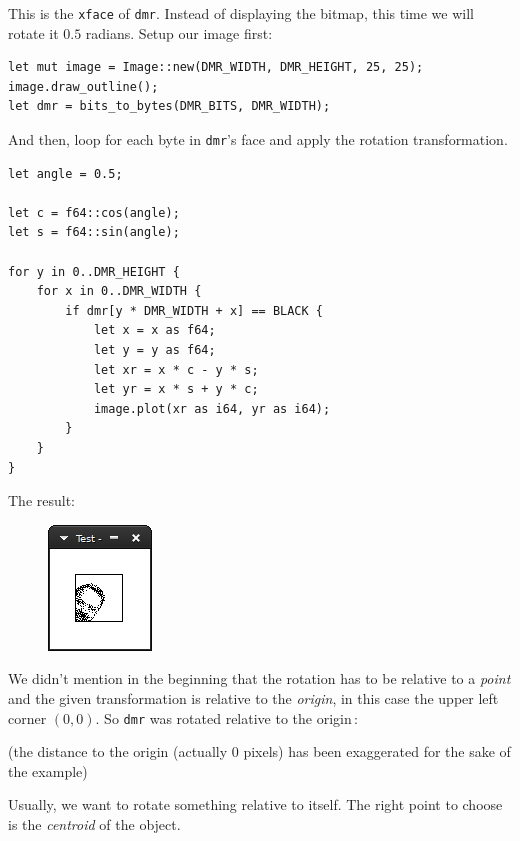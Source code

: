 \documentclass[12pt,openany,a4,usenames,dvipsnames]{book}
\newcommand\bitmap{{\pixelfont{}bitmap}}
\newcommand\pixels{{\pixelfont{}pixels}}
\begin{document}
This is the \texttt{xface} of \texttt{dmr}. Instead of displaying the \bitmap{}, this time we will rotate it $0.5$ radians. Setup our image first:


\begin{verbatim}
let mut image = Image::new(DMR_WIDTH, DMR_HEIGHT, 25, 25);
image.draw_outline();
let dmr = bits_to_bytes(DMR_BITS, DMR_WIDTH);
\end{verbatim}

And then, loop for each byte in \texttt{dmr}'s face and apply the rotation transformation.

\begin{verbatim}
let angle = 0.5;

let c = f64::cos(angle);
let s = f64::sin(angle);

for y in 0..DMR_HEIGHT {
    for x in 0..DMR_WIDTH {
        if dmr[y * DMR_WIDTH + x] == BLACK {
            let x = x as f64;
            let y = y as f64;
            let xr = x * c - y * s;
            let yr = x * s + y * c;
            image.plot(xr as i64, yr as i64);
        }
    }
}
\end{verbatim}

The result:

\begin{figure}[H]
\centering
\includegraphics{figures/ch11-2.png}
\end{figure}

We didn't mention in the beginning that the rotation has to be relative to a \emph{point} and the given transformation is relative to the \emph{origin}, in this case the upper left corner $(0,0)$. So \texttt{dmr} was rotated relative to the origin\,:
\begin{figure}[H]
\centering
  \def\svgscale{0.6}

  \def\svgscale{0.6}

\end{figure}

{\centering{}
\noindent(the distance to the origin (actually 0 \pixels{}) has been exaggerated for the sake of the example)
}

Usually, we want to rotate something relative to itself. The right point to choose is the \emph{centroid} of the object.
\end{document}
